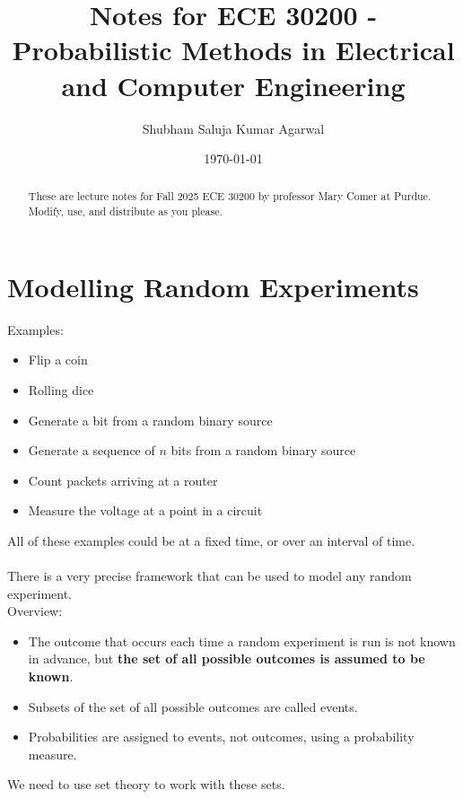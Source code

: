 \documentclass[nobib]{tufte-handout}
\title{Notes for ECE 30200 - Probabilistic Methods in Electrical and Computer Engineering}
\author[Shubham Saluja Kumar Agarwal]{Shubham Saluja Kumar Agarwal}
\date{\today}  %
\begin{document}
\maketitle

\begin{abstract}
    These are lecture notes for Fall 2025 ECE 30200 by professor Mary Comer at Purdue. Modify, use, and distribute as you please.
\end{abstract}

\tableofcontents

\newpage

\section{Modelling Random Experiments}
Examples:
\begin{itemize}
    \item Flip a coin 
    \item Rolling dice
    \item Generate a bit from a random binary source
    \item Generate a sequence of $n$ bits from a random binary source
    \item Count packets arriving at a router
    \item Measure the voltage at a point in a circuit
\end{itemize}
All of these examples could be at a fixed time, or over an interval of time.\\~\\
There is a very precise framework that can be used to model any random experiment.\\
Overview:
\begin{itemize}
    \item The outcome that occurs each time a random experiment is run is not known in advance, but \textbf{the set of all possible outcomes is assumed to be known}.
    \item Subsets of the set of all possible outcomes are called events.
    \item Probabilities are assigned to events, not outcomes, using a probability measure.
\end{itemize}
We need to use set theory to work with these sets.
\end{document}
